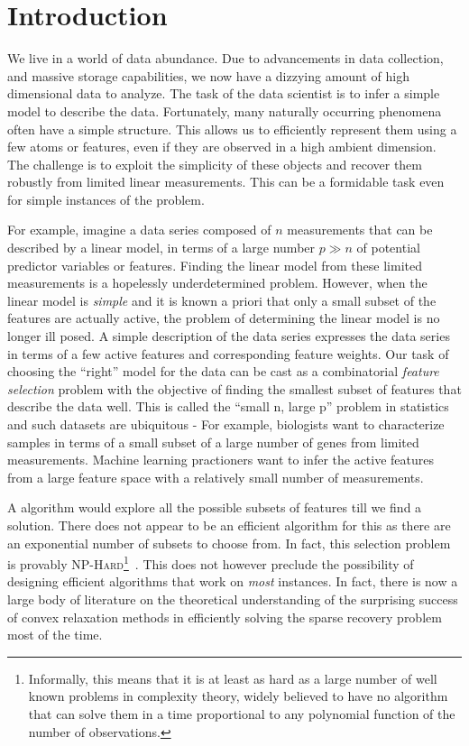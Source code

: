 \chapter{Introduction}

We live in a world of data abundance. Due to advancements in data collection,
and massive storage capabilities, we now have a dizzying amount of high
dimensional data to analyze. The task of the data scientist is to infer a simple
model to describe the data. Fortunately, many naturally occurring phenomena
often have a simple structure. This allows us to efficiently represent them
using a few atoms or features, even if they are observed in a high ambient
dimension. The challenge is to exploit the simplicity of these objects and
recover them robustly from limited linear measurements. This can be a formidable
task even for simple instances of the problem.

For example, imagine a data series composed of $n$ measurements that can be
described by a linear model, in terms of a large number $p \gg n$ of potential
predictor variables or features. Finding the linear model from these limited
measurements is a hopelessly underdetermined problem. However, when the linear
model is \emph{simple} and it is known a priori that only a small subset of the
features are actually active, the problem of determining the linear model is no
longer ill posed. A simple description of the data series expresses the data
series in terms of a few active features and corresponding feature weights. Our
task of choosing the ``right'' model for the data can be cast as a combinatorial
\emph{feature selection} problem with the objective of finding the smallest
subset of features that describe the data well. This is called the ``small n,
large p'' problem in statistics and such datasets are ubiquitous - For example,
biologists want to characterize samples in terms of a small subset of a large
number of genes from limited measurements. Machine learning practioners want to
infer the active features from a large feature space with a relatively small
number of measurements.

A \naive{} algorithm would explore all the possible subsets of features till we
find a solution. There does not appear to be an efficient algorithm for this as
there are an exponential number of subsets to choose from. In fact, this
selection problem is provably \textsc{NP-Hard}\footnote{Informally, this means
that it is at least as hard as a large number of well known problems in
complexity theory, widely believed to have no algorithm that can solve them in a
time proportional to any polynomial function of the number of
observations.}~\cite{Natarajan95}. This does not however preclude the
possibility of designing efficient algorithms that work on \emph{most}
instances. In fact, there is now a large body of literature on the theoretical
understanding of the surprising success of convex relaxation methods in
efficiently solving the sparse recovery problem most of the time.

